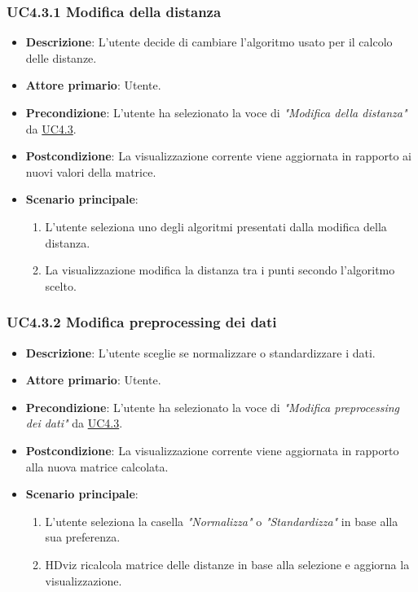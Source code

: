 \subsubsection{UC4.3.1 Modifica della distanza}
\label{ssub:uc4.3.1}
\begin{itemize}
    \item \textbf{Descrizione}: L’utente decide di cambiare l’algoritmo usato per il calcolo delle distanze.

    \item \textbf{Attore primario}: Utente.
    
    \item \textbf{Precondizione}:   L'utente ha selezionato la voce di \emph{"Modifica della distanza"} da \hyperref[ssub:uc4.3]{UC4.3}.
    \item \textbf{Postcondizione}:  La visualizzazione corrente viene aggiornata in rapporto ai nuovi valori della matrice.

	\item \textbf{Scenario principale}:
        \begin{enumerate}
            \item L'utente seleziona uno degli algoritmi presentati dalla modifica della distanza.
            \item La visualizzazione modifica la distanza tra i punti secondo l'algoritmo scelto.
        \end{enumerate}
\end{itemize}

\subsubsection{UC4.3.2 Modifica preprocessing dei dati}
\label{ssub:uc4.3.2}
\begin{itemize}
    \item \textbf{Descrizione}: L’utente sceglie se normalizzare o standardizzare i dati.

    \item \textbf{Attore primario}: Utente.
    \item \textbf{Precondizione}: L'utente ha selezionato la voce di \emph{"Modifica preprocessing dei dati"} da \hyperref[ssub:uc4.3]{UC4.3}.
    \item \textbf{Postcondizione}: La visualizzazione corrente viene aggiornata in rapporto alla nuova matrice calcolata.
    \item \textbf{Scenario principale}:
    \begin{enumerate}
        \item L'utente seleziona la casella \emph{"Normalizza"} o \emph{"Standardizza"} in base alla sua preferenza.
        \item HDviz ricalcola matrice delle distanze in base alla selezione e aggiorna la visualizzazione.
    \end{enumerate}
\end{itemize}

